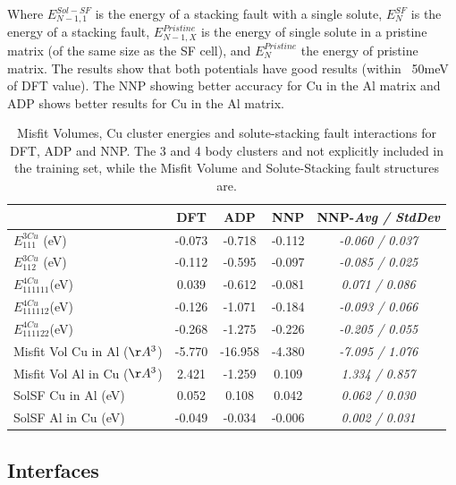 \documentclass{article}
\begin{document}
Where $E^{Sol-SF}_{N-1,1}$ is the energy of a stacking fault with a single solute,
$E^{SF}_{N}$ is the energy of a stacking fault,
$E^{Pristine}_{N-1,X}$ is the energy of single solute in a pristine matrix (of the same size as the SF cell), 
and $E^{Pristine}_{N}$ the energy of pristine matrix. 
The results show that both potentials have good results (within ~50meV of DFT value).
The NNP showing better accuracy for Cu in the Al matrix and ADP shows better results for Cu in the Al matrix.


\begin{table}[h!]
\begin{tabular}{l|cccc}%
\hline%
&DFT&ADP&NNP& NNP-\emph{Avg / StdDev}\\%
\hline%
$E^{3Cu}_{111}$ (eV)&-0.073&{-}0.718&{-}0.112&\emph{-0.060 / 0.037}\\%
$E^{3Cu}_{112}$ (eV)&-0.112&{-}0.595&{-}0.097&\emph{-0.085 / 0.025}\\%
$E^{4Cu}_{111111}$(eV)&0.039&{-}0.612&{-}0.081&\emph{0.071 / 0.086}\\%
$E^{4Cu}_{111112}$(eV)&-0.126&{-}1.071&{-}0.184&\emph{-0.093 / 0.066}\\%
$E^{4Cu}_{111122}$(eV)&-0.268&{-}1.275&{-}0.226&\emph{-0.205 / 0.055}\\%
Misfit Vol Cu in Al ($\AA^3$)&{-}5.770&{-}16.958&{-}4.380&\emph{-7.095 / 1.076}\\%
Misfit Vol Al in Cu ($\AA^3$)&2.421&{-}1.259&0.109&\emph{1.334 / 0.857}\\%
SolSF Cu in Al (eV)&0.052&0.108&0.042&\emph{0.062 / 0.030}\\%
SolSF Al in Cu (eV)&{-}0.049&{-}0.034&{-}0.006&\emph{0.002 / 0.031}\\%
\end{tabular}%
\caption{Misfit Volumes, Cu cluster energies and solute-stacking fault interactions for DFT, ADP and NNP. 
The 3 and 4 body clusters and not explicitly included in the training set, while the Misfit Volume and 
Solute-Stacking fault structures are.}
\label{table:solute_special}
\end{table}

\subsection{Interfaces} \label{sct:interfaces}
 
\end{document}
